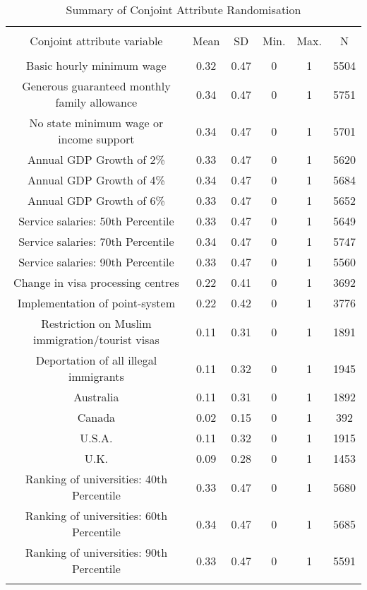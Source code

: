 
\begin{table}[!htbp] \centering 
  \caption{Summary of Conjoint Attribute Randomisation} 
  \label{tab:randomisation} 
\begin{tabular}{@{\extracolsep{5pt}} cccccc} 
\\[-1.8ex]\hline 
\hline \\[-1.8ex] 
Conjoint attribute variable & Mean & SD & Min. & Max. & N \\ 
\hline \\[-1.8ex] 
Basic hourly minimum wage & 0.32 & 0.47 & 0 & 1 & 5504 \\ 
Generous guaranteed monthly family allowance & 0.34 & 0.47 & 0 & 1 & 5751 \\ 
No state minimum wage or income support & 0.34 & 0.47 & 0 & 1 & 5701 \\ 
Annual GDP Growth of 2\% & 0.33 & 0.47 & 0 & 1 & 5620 \\ 
Annual GDP Growth of 4\% & 0.34 & 0.47 & 0 & 1 & 5684 \\ 
Annual GDP Growth of 6\% & 0.33 & 0.47 & 0 & 1 & 5652 \\ 
Service salaries: 50th Percentile & 0.33 & 0.47 & 0 & 1 & 5649 \\ 
Service salaries: 70th Percentile & 0.34 & 0.47 & 0 & 1 & 5747 \\ 
Service salaries: 90th Percentile & 0.33 & 0.47 & 0 & 1 & 5560 \\ 
Change in visa processing centres & 0.22 & 0.41 & 0 & 1 & 3692 \\ 
Implementation of point-system & 0.22 & 0.42 & 0 & 1 & 3776 \\ 
Restriction on Muslim immigration/tourist visas & 0.11 & 0.31 & 0 & 1 & 1891 \\ 
Deportation of all illegal immigrants & 0.11 & 0.32 & 0 & 1 & 1945 \\ 
Australia & 0.11 & 0.31 & 0 & 1 & 1892 \\ 
Canada & 0.02 & 0.15 & 0 & 1 & 392 \\ 
U.S.A. & 0.11 & 0.32 & 0 & 1 & 1915 \\ 
U.K. & 0.09 & 0.28 & 0 & 1 & 1453 \\ 
Ranking of universities: 40th Percentile & 0.33 & 0.47 & 0 & 1 & 5680 \\ 
Ranking of universities: 60th Percentile & 0.34 & 0.47 & 0 & 1 & 5685 \\ 
Ranking of universities: 90th Percentile & 0.33 & 0.47 & 0 & 1 & 5591 \\ 
\hline \\[-1.8ex] 
\end{tabular} 
\end{table} 
